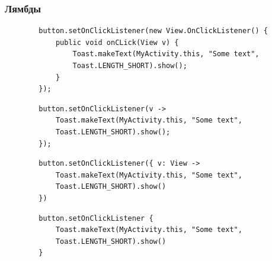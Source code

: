 \documentclass{beamer}
\begin{document}
\begin{frame}[fragile, t]
    \frametitle{Лямбды}
    \begin{verbatim}
        button.setOnClickListener(new View.OnClickListener() {
            public void onCLick(View v) {
                Toast.makeText(MyActivity.this, "Some text",
                Toast.LENGTH_SHORT).show();
            }
        });
    \end{verbatim}

    \begin{verbatim}
        button.setOnClickListener(v ->
            Toast.makeText(MyActivity.this, "Some text",
            Toast.LENGTH_SHORT).show();
        });
    \end{verbatim}

    \begin{verbatim}
        button.setOnClickListener({ v: View ->
            Toast.makeText(MyActivity.this, "Some text",
            Toast.LENGTH_SHORT).show()
        })
    \end{verbatim}

    \begin{verbatim}
        button.setOnClickListener {
            Toast.makeText(MyActivity.this, "Some text",
            Toast.LENGTH_SHORT).show()
        }
    \end{verbatim}
\end{frame}
\end{document}
